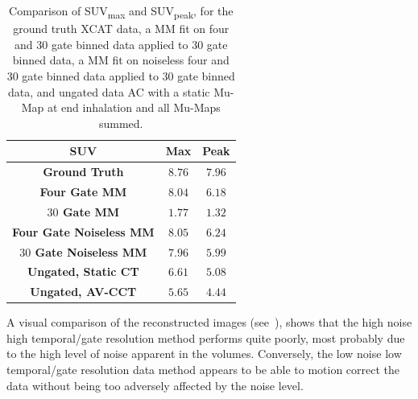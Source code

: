             \begin{table}
                \centering
                
                \captionsetup{singlelinecheck=false}
                \caption{
                    Comparison of \gls{SUV}\textsubscript{max} and \gls{SUV}\textsubscript{peak}, for the ground truth \gls{XCAT} data, a \gls{MM} fit on four and $30$ gate binned data applied to $30$ gate binned data, a \gls{MM} fit on noiseless four and $30$ gate binned data applied to $30$ gate binned data, and ungated data \gls{AC} with a static \gls{Mu-Map} at end inhalation and all \glspl{Mu-Map} summed.
                }
                
                \resizebox*{1.0\linewidth}{!}
                {
                    \begin{tabular}{||c|cc||}
                        \hline
                        \textbf{\gls{SUV}}                      & \textbf{Max}  & \textbf{Peak} \\
                        \hline
                        \textbf{Ground Truth}                   & $8.76$        & $7.96$ \\
                        \hline
                        \textbf{Four Gate \gls{MM}}             & $8.04$        & $6.18$ \\
                        \textbf{$30$ Gate \gls{MM}}             & $1.77$        & $1.32$ \\
                        \hline
                        \textbf{Four Gate Noiseless \gls{MM}}   & $8.05$        & $6.24$ \\
                        \textbf{$30$ Gate Noiseless \gls{MM}}   & $7.96$        & $5.99$ \\
                        \hline
                        \textbf{Ungated, Static \gls{CT}}       & $6.61$        & $5.08$ \\
                        \textbf{Ungated, \gls{AV-CCT}}          & $5.65$        & $4.44$ \\
                        \hline
                    \end{tabular}
                }
                \label{tab:pet_ct_motion_correction_exploiting_motion_models_fit_on_coarsely_gated_data_applied_to_finely_gated_data_results_suv}
            \end{table}
            
            A visual comparison of the reconstructed images (see~), shows that the high noise high temporal/gate resolution method performs quite poorly, most probably due to the high level of noise apparent in the volumes. Conversely, the low noise low temporal/gate resolution data method appears to be able to motion correct the data without being too adversely affected by the noise level.
             
